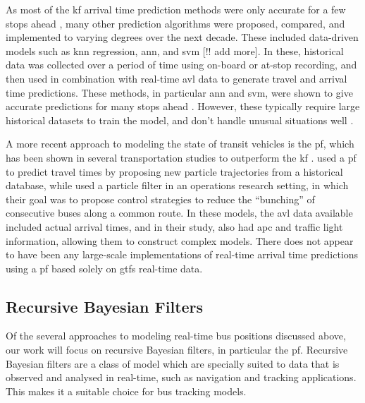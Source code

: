 \documentclass[12pt,a4paper]{article}
\begin{document}
As most of the \gls{kf} arrival time prediction methods were only accurate for
a few stops ahead \citep{yu-etal:2006},
many other prediction algorithms were proposed, compared, and implemented
to varying degrees over the next decade.
These included data-driven models such as \gls{knn} regression,
\gls{ann}, and \gls{svm} 
\citep{chang-etal:2010,jeong-rilett:2005,yu-etal:2006,yu-etal:2010,yu-etal:2011} [!! add more].
In these, historical data was collected over a period of time using on-board or at-stop recording,
and then used in combination with
real-time \gls{avl} data to generate travel and arrival time predictions.
These methods, in particular \gls{ann} and \gls{svm},
were shown to give accurate predictions for many stops ahead \citep{cn}.
However, these typically require large historical datasets to train the model,
and don't handle unusual situations well \citep{cn}.


A more recent approach to modeling the state of transit vehicles is the \gls{pf},
which has been shown in several transportation studies to outperform the \gls{kf}
\citep{chen-rakha:2014,cn}.
\cite{chen-rakha:2014} used a \gls{pf} to predict travel times 
by proposing new particle trajectories from a historical database,
while \cite{hans-etal:2015} used a particle filter in an operations research setting,
in which their goal was to propose control strategies to reduce the ``bunching''
of consecutive buses along a common route.
In these models, the \gls{avl} data available included actual arrival times, and in their study,
\cite{hans-etal:2015} also had \gls{apc} and traffic light information, 
allowing them to construct complex models.
There does not appear to have been any large-scale implementations of 
real-time arrival time predictions using a \gls{pf} based solely on \gls{gtfs} real-time data.




\subsection{Recursive Bayesian Filters}
\label{sec:recursive}


Of the several approaches to modeling real-time bus positions discussed above,
our work will focus on recursive Bayesian filters, in particular the \gls{pf}.
Recursive Bayesian filters are a class of model which 
are specially suited to data that is observed and analysed in real-time,
such as navigation and tracking applications.
This makes it a suitable choice for bus tracking models.
\end{document}
